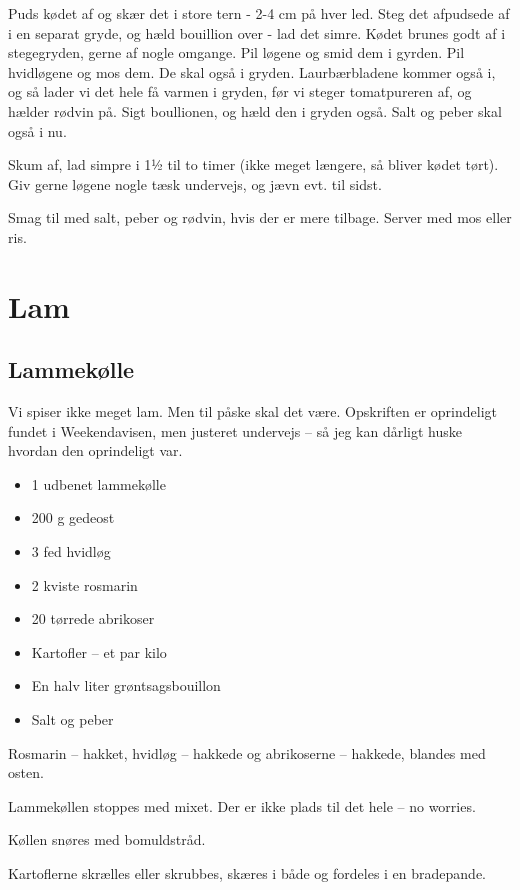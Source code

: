 \documentclass[
]{book}
\providecommand{\tightlist}{%
  \setlength{\itemsep}{0pt}\setlength{\parskip}{0pt}}
\begin{document}
Puds kødet af og skær det i store tern - 2-4 cm på hver led.
Steg det afpudsede af i en separat gryde, og hæld bouillion over - lad det
simre.
Kødet brunes godt af i stegegryden, gerne af nogle omgange.
Pil løgene og smid dem i gyrden.
Pil hvidløgene og mos dem. De skal også i gryden.
Laurbærbladene kommer også i, og så lader vi det hele få varmen i gryden,
før vi steger tomatpureren af, og hælder rødvin på.
Sigt boullionen, og hæld den i gryden også. Salt og peber skal også i nu.

Skum af, lad simpre i 1½ til to timer (ikke meget længere, så bliver kødet
tørt). Giv gerne løgene nogle tæsk undervejs, og jævn evt. til sidst.

Smag til med salt, peber og rødvin, hvis der er mere tilbage. Server med mos eller
ris.

\chapter{Lam}\label{lam}

\section{Lammekølle}\label{lammekuxf8lle}

Vi spiser ikke meget lam. Men til påske skal det være. Opskriften er oprindeligt fundet i Weekendavisen, men justeret undervejs -- så jeg kan dårligt huske hvordan den oprindeligt var.

\begin{itemize}
\tightlist
\item
  1 udbenet lammekølle
\item
  200 g gedeost
\item
  3 fed hvidløg
\item
  2 kviste rosmarin
\item
  20 tørrede abrikoser
\item
  Kartofler -- et par kilo
\item
  En halv liter grøntsagsbouillon
\item
  Salt og peber
\end{itemize}

Rosmarin -- hakket, hvidløg -- hakkede og abrikoserne -- hakkede, blandes med osten.

Lammekøllen stoppes med mixet. Der er ikke plads til det hele -- no worries.

Køllen snøres med bomuldstråd.

Kartoflerne skrælles eller skrubbes, skæres i både og fordeles i en bradepande.
\end{document}
